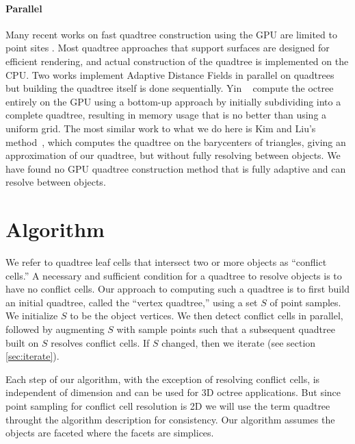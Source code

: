 \documentclass[final,3p,times,twocolumn]{elsarticle}
\begin{document}
\paragraph{Parallel} Many recent works on fast quadtree construction using the GPU are limited to point sites \cite{bedorf2012sparse,karras2012maximizing,zhou2011data}.
 Most quadtree approaches that support surfaces \cite{baert2013out,crassin2009gigavoxels,laine2011efficient,lefebvre2007compressed} are designed for efficient rendering, and actual construction of the quadtree is implemented on the CPU. Two works \cite{bastos2008gpu,park2010cuda} implement Adaptive Distance Fields in parallel on quadtrees but building the quadtree itself is done sequentially.  Yin \etal~ compute the octree entirely on the GPU using a bottom-up approach by initially subdividing into a complete quadtree, resulting in memory usage that is no better than using a uniform grid.
The most similar work to what we do here is Kim and Liu's method~, which computes the quadtree on the barycenters of triangles, giving an approximation of our quadtree, but without fully resolving between objects.
We have found no GPU quadtree construction method that is fully adaptive and can resolve between objects.

\section{Algorithm}
\label{sec:algorithm}

We refer to quadtree leaf cells that intersect two or more objects as ``conflict cells.'' A necessary and sufficient condition for a quadtree to resolve objects is to have no conflict cells. Our approach to computing such a quadtree is to first build an initial quadtree, called the ``vertex quadtree,'' using a set $S$ of point samples. We initialize $S$ to be the object vertices. We then detect conflict cells in parallel, followed by augmenting $S$ with sample points such that a subsequent quadtree built on $S$ resolves conflict cells. If $S$ changed, then we iterate (see section \ref{sec:iterate}).

Each step of our algorithm, with the exception of resolving conflict cells, is independent of dimension and can be used for 3D octree applications. But since point sampling for conflict cell resolution is 2D we will use the term quadtree throught the algorithm description for consistency. Our algorithm assumes the objects are faceted where the facets are simplices.
\end{document}

